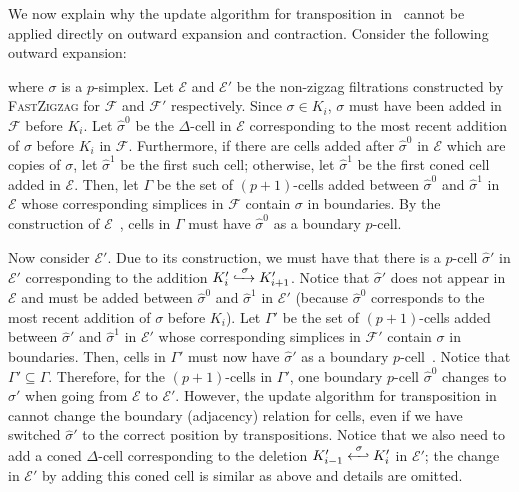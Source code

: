 \documentclass[letterpaper,11pt]{article}
\theoremstyle{mythmstyle}
\theoremstyle{mydefstyle}
\theoremstyle{plain}
\theoremstyle{definition}
\newcommand{\<}[1]{\langle #1\rangle}
\newcommand{\lbarrowspace}{\;}
\newcommand{\inctosp}[1]{\xhookrightarrow{\lbarrowspace#1\lbarrowspace}}
\newcommand{\bakinctosp}[1]{\xhookleftarrow{\lbarrowspace#1\lbarrowspace}}
\newcommand{\Ecal}{\mathcal{E}}
\newcommand{\Fcal}{\mathcal{F}}
\newcommand{\DG}{\Delta}
\newcommand{\GG}{\Gamma}
\newcommand{\sG}{\sigma}
\newcommand{\Dim}{p}
\newcommand{\filtcnt}{m}
\newcommand{\ef}{\Ecal}
\begin{document}
We now explain why the update algorithm for transposition in~\cite{cohen2006vines} cannot be 
applied directly on outward expansion and contraction. 
Consider the following outward expansion:

\vspace{-0.5em}
\begin{center}
\end{center}

\vspace{-1em}\noindent
where $\sG$ is a $\Dim$-simplex.
Let $\ef$ and $\ef'$ be the non-zigzag filtrations constructed 
by \textsc{FastZigzag} for $\Fcal$ and $\Fcal'$ respectively.
Since $\sG\in K_i$, $\sG$ must have been added in $\Fcal$ before
$K_i$. Let $\hat{\sG}^0$ be the $\DG$-cell in $\ef$ corresponding to the most 
recent addition of $\sG$ before $K_i$ in $\Fcal$.
Furthermore, if there are cells added after $\hat{\sG}^0$ 
in $\ef$ which are copies of $\sG$,
let $\hat{\sG}^1$ be the first such cell;
otherwise, let $\hat{\sG}^1$ be the first coned cell added in $\ef$.
Then, let $\GG$ be the set of $(\Dim+1)$-cells added between $\hat{\sG}^0$ and $\hat{\sG}^1$
in $\ef$ whose corresponding simplices in $\Fcal$ 
contain $\sG$ in boundaries.
By the construction of $\ef$~\cite{dey2022fast},
cells in $\GG$ must have $\hat{\sG}^0$ as a boundary $\Dim$-cell.

Now consider $\ef'$. Due to its construction,
we must have that there is a $\Dim$-cell $\hat{\sG}'$ in $\ef'$
corresponding to the addition $K'_i\inctosp{\sG}K'_{i+1}$.
Notice that $\hat{\sG}'$ does not appear in $\ef$ and must be
added between $\hat{\sG}^0$ and $\hat{\sG}^1$ in $\ef'$
(because $\hat{\sG}^0$ corresponds to the most 
recent addition of $\sG$ before $K_i$).
Let $\GG'$ be the set of $(\Dim+1)$-cells added between $\hat{\sG}'$ and $\hat{\sG}^1$
in $\ef'$ whose corresponding simplices in $\Fcal'$
contain $\sG$ in boundaries.
Then, cells in $\GG'$ must now have $\hat{\sG}'$ as a boundary $\Dim$-cell~\cite{dey2022fast}.
Notice that $\GG'\subseteq\GG$.
Therefore, for the $(\Dim+1)$-cells in $\GG'$,
one boundary $\Dim$-cell
$\hat{\sG}^0$ changes to $\hat{\sG}'$
when going from $\ef$ to $\ef'$.
However, the update algorithm for transposition in~\cite{cohen2006vines}
cannot change the boundary (adjacency) relation for cells,
even if we have switched $\hat{\sG}'$ to the correct position by transpositions.
Notice that we also need to add a coned $\DG$-cell corresponding to
the deletion $K'_{i-1}\bakinctosp{\sG}K'_i$ in $\ef'$;
the change in $\ef'$ by adding this coned cell is similar as above
and details are omitted.
\end{document}
